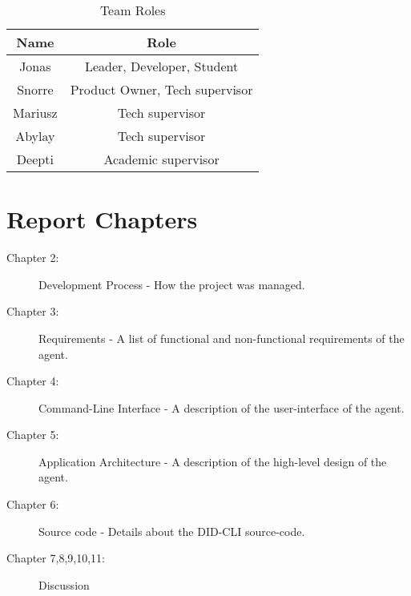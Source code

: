\begin{table}
  \centering
  \caption{Team Roles}
  \label{tab:example1}
  \begin{tabular}{cc}
    \hline
    Name  & Role \\
    \hline
    Jonas       & Leader, Developer, Student         \\
    Snorre      & Product Owner, Tech supervisor \\
    Mariusz     & Tech supervisor \\
    Abylay      & Tech supervisor \\
    Deepti      & Academic supervisor \\
    \hline
  \end{tabular}
\end{table}


\section{Report Chapters}

\begin{description}
    \item[Chapter 2:] Development Process - How the project was managed.
    \item[Chapter 3:] Requirements - A list of functional and non-functional requirements of the agent.
    \item[Chapter 4:] Command-Line Interface - A description of the user-interface of the agent.
    \item[Chapter 5:] Application Architecture - A description of the high-level design of the agent.
    \item[Chapter 6:] Source code - Details about the DID-CLI source-code.
    \item[Chapter 7,8,9,10,11:] Discussion

\end{description}




















